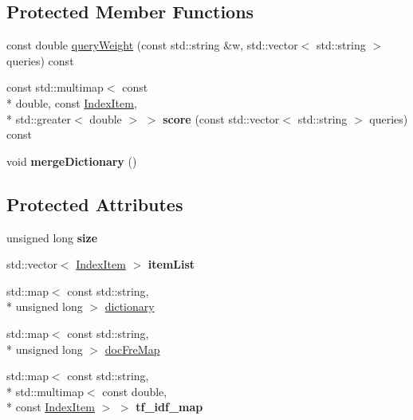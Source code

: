 \subsection*{Protected Member Functions}
\begin{DoxyCompactItemize}
\item 
const double \hyperlink{classIndexer_aebf2b251e2b794d266710b782bb3e08f}{query\-Weight} (const std\-::string \&w, std\-::vector$<$ std\-::string $>$ queries) const 
\item 
\hypertarget{classIndexer_a50a68e42a87b267f675536257cf51df0}{const std\-::multimap$<$ const \\*
double, const \hyperlink{classIndexItem}{Index\-Item}, \\*
std\-::greater$<$ double $>$ $>$ {\bfseries score} (const std\-::vector$<$ std\-::string $>$ queries) const }\label{classIndexer_a50a68e42a87b267f675536257cf51df0}

\item 
\hypertarget{classIndexer_a165956cbf127244fa35bb5a03feb14f6}{void {\bfseries merge\-Dictionary} ()}\label{classIndexer_a165956cbf127244fa35bb5a03feb14f6}

\end{DoxyCompactItemize}
\subsection*{Protected Attributes}
\begin{DoxyCompactItemize}
\item 
\hypertarget{classIndexer_acf4b55a819c5aa20627d82fa5db6d6b4}{unsigned long {\bfseries size}}\label{classIndexer_acf4b55a819c5aa20627d82fa5db6d6b4}

\item 
\hypertarget{classIndexer_aca2bf335cd368f8c7d7772030ee8d7b2}{std\-::vector$<$ \hyperlink{classIndexItem}{Index\-Item} $>$ {\bfseries item\-List}}\label{classIndexer_aca2bf335cd368f8c7d7772030ee8d7b2}

\item 
std\-::map$<$ const std\-::string, \\*
unsigned long $>$ \hyperlink{classIndexer_a31dba7bca42ac3ca2a7fef6a4f6e6662}{dictionary}
\item 
std\-::map$<$ const std\-::string, \\*
unsigned long $>$ \hyperlink{classIndexer_aa51c6ee5ecb0de0e5dc1eaf7ffb4621f}{doc\-Fre\-Map}
\item 
\hypertarget{classIndexer_aeed3684e566f3970a43bd78524ad0b2c}{std\-::map$<$ const std\-::string, \\*
std\-::multimap$<$ const double, \\*
const \hyperlink{classIndexItem}{Index\-Item} $>$ $>$ {\bfseries tf\-\_\-idf\-\_\-map}}\label{classIndexer_aeed3684e566f3970a43bd78524ad0b2c}

\end{DoxyCompactItemize}
